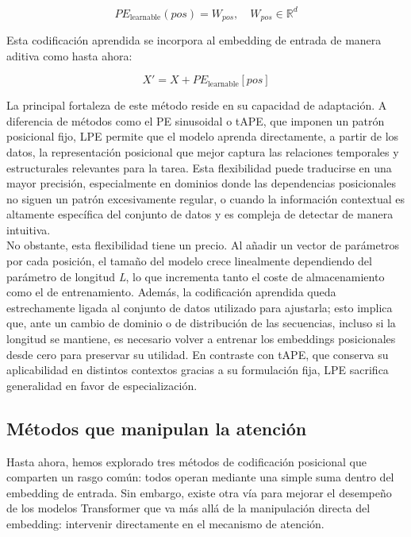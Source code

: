 $$
PE_{\text{learnable}}(pos) = W_{pos}, \quad W_{pos} \in \mathbb{R}^d
$$

Esta codificación aprendida se incorpora al embedding de entrada de manera aditiva como hasta ahora:


$$
X' = X + PE_{\text{learnable}}[pos]
$$

La principal fortaleza de este método reside en su capacidad de adaptación. A diferencia de métodos como el PE sinusoidal o tAPE, que imponen un patrón posicional fijo, LPE permite que el modelo aprenda directamente, a partir de los datos, la representación posicional que mejor captura las relaciones temporales y estructurales relevantes para la tarea. Esta flexibilidad puede traducirse en una mayor precisión, especialmente en dominios donde las dependencias posicionales no siguen un patrón excesivamente regular, o cuando la información contextual es altamente específica del conjunto de datos y es compleja de detectar de manera intuitiva.\\

No obstante, esta flexibilidad tiene un precio. Al añadir un vector de parámetros por cada posición, el tamaño del modelo crece linealmente dependiendo del parámetro de longitud \textit{L}, lo que incrementa tanto el coste de almacenamiento como el de entrenamiento. Además, la codificación aprendida queda estrechamente ligada al conjunto de datos utilizado para ajustarla; esto implica que, ante un cambio de dominio o de distribución de las secuencias, incluso si la longitud se mantiene, es necesario volver a entrenar los embeddings posicionales desde cero para preservar su utilidad. En contraste con tAPE, que conserva su aplicabilidad en distintos contextos gracias a su formulación fija, LPE sacrifica generalidad en favor de especialización.


\subsection{Métodos que manipulan la atención}

Hasta ahora, hemos explorado tres métodos de codificación posicional que comparten un rasgo común: todos operan mediante una simple suma dentro del embedding de entrada. Sin embargo, existe otra vía para mejorar el desempeño de los modelos Transformer que va más allá de la manipulación directa del embedding: intervenir directamente en el mecanismo de atención.\\

